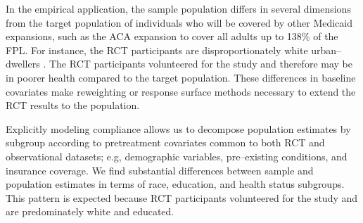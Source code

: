 \documentclass[hidelinks,12pt]{article}
\begin{document}
In the empirical application, the sample population differs in several dimensions from the target population of individuals who will be covered by other Medicaid expansions, such as the ACA expansion to cover all adults up to 138\% of the FPL. For instance, the RCT participants are disproportionately white urban--dwellers \citep{Taubman}. The RCT participants volunteered for the study and therefore may be in poorer health compared to the target population. These differences in baseline covariates make reweighting or response surface methods necessary to extend the RCT results to the population.

Explicitly modeling compliance allows us to decompose population estimates by subgroup according to pretreatment covariates common to both RCT and observational datasets; e.g, demographic variables, pre--existing conditions, and insurance coverage. We find substantial differences between sample and population estimates in terms of race, education, and health status subgroups. This pattern is expected because RCT participants volunteered for the study and are predominately white and educated.

\pagebreak



\end{document}
